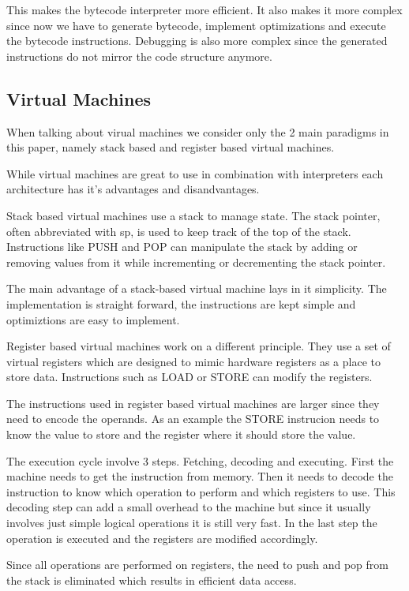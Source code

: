 \documentclass{article}
\begin{document}
This makes the bytecode interpreter more efficient. It also makes it more
complex since now we have to generate bytecode, implement optimizations
and execute the bytecode instructions. Debugging is also more complex since
the generated instructions do not mirror the code structure anymore.

\subsection{Virtual Machines}
When talking about virual machines we consider only the 2 main paradigms in
this paper, namely stack based and register based virtual machines.

While virtual machines are great to use in combination with interpreters
each architecture has it's advantages and disandvantages.

Stack based virtual machines use a stack to manage state. The stack pointer,
often abbreviated with sp, is used to keep track of the top of the stack.
Instructions like PUSH and POP can manipulate the stack by adding or removing
values from it while incrementing or decrementing the stack pointer.

The main advantage of a stack-based virtual machine lays in it simplicity.
The implementation is straight forward, the instructions are kept simple
and optimiztions are easy to implement.

Register based virtual machines work on a different principle. They use a set of
virtual registers which are designed to mimic hardware registers as a place to
store data. Instructions such as LOAD or STORE can modify the registers.

The instructions used in register based virtual machines are larger since they
need to encode the operands. As an example the STORE instrucion needs to know 
the value to store and the register where it should store the value.

The execution cycle involve 3 steps. Fetching, decoding and executing. First
the machine needs to get the instruction from memory. Then it needs to decode
the instruction to know which operation to perform and which registers to use.
This decoding step can add a small overhead to the machine but since it usually
involves just simple logical operations it is still very fast. In the last step
the operation is executed and the registers are modified accordingly.

Since all operations are performed on registers, the need to push and pop from
the stack is eliminated which results in efficient data access.
\end{document}
